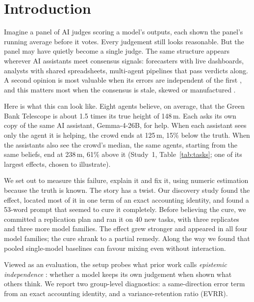\documentclass[10pt]{article}
\theoremstyle{manuscript}\newtheorem{proposition}{Proposition}
\begin{document}
\clearpage
\section{Introduction}
Imagine a panel of AI judges scoring a model's outputs, each shown the panel's running average before it votes. Every judgement still looks reasonable. But the panel may have quietly become a single judge. The same structure appears wherever AI assistants meet consensus signals: forecasters with live dashboards, analysts with shared spreadsheets, multi-agent pipelines that pass verdicts along. A second opinion is most valuable when its errors are independent of the first \citep{kleinberg2021,kim2025corr}, and this matters most when the consensus is stale, skewed or manufactured \citep{demarzo2003,denisov2026}.

Here is what this can look like. Eight agents believe, on average, that the Green Bank Telescope is about 1.5 times its true height of 148\,m. Each asks its own copy of the same AI assistant, Gemma-4-26B, for help. When each assistant sees only the agent it is helping, the crowd ends at 125\,m, 15\% below the truth. When the assistants also see the crowd's median, the same agents, starting from the same beliefs, end at 238\,m, 61\% above it (Study~1, Table~\ref{tab:tasks}; one of its largest effects, chosen to illustrate).

We set out to measure this failure, explain it and fix it, using numeric estimation because the truth is known. The story has a twist. Our discovery study found the effect, located most of it in one term of an exact accounting identity, and found a 53-word prompt that seemed to cure it completely. Before believing the cure, we committed a replication plan and ran it on 40 new tasks, with three replicates and three more model families. The effect grew stronger and appeared in all four model families; the cure shrank to a partial remedy. Along the way we found that pooled single-model baselines can favour mixing even without interaction.

Viewed as an evaluation, the setup probes what prior work calls \emph{epistemic independence} \citep{kelley2026}: whether a model keeps its own judgement when shown what others think. We report two group-level diagnostics: a same-direction error term from an exact accounting identity, and a variance-retention ratio (EVRR).
\end{document}
